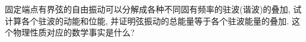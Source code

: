 

\begin{exercise}
  固定端点有界弦的自由振动可以分解成各种不同固有频率的驻波(谐波)的叠加,
  试计算各个驻波的动能和位能, 并证明弦振动的总能量等于各个驻波能量的叠加.
  这个物理性质对应的数学事实是什么?
\end{exercise}

